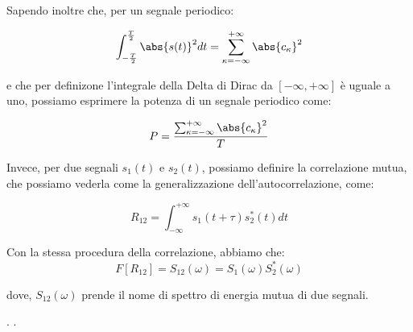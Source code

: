 Sapendo inoltre che, per un segnale periodico: 

{
    \Large 
    \begin{equation}
        \int_{-\frac{T}{2}}^{\frac{T}{2}} 
            \abs{s(t)}^{2} 
            dt 
            =
            \sum_{\kappa = - \infty}^{+ \infty} 
            \abs{c_\kappa}^{2}
    \end{equation}
} 

e che per definizone l'integrale della Delta di Dirac da $[- \infty,  + \infty]$ è uguale a uno, 
possiamo esprimere la potenza di un segnale periodico come: 

{
    \Large 
    \begin{equation}
        P = \frac{\sum_{\kappa = - \infty}^{+ \infty} 
        \abs{c_\kappa}^{2}}{T}
    \end{equation}
}

Invece, per due segnali $s_1 (t)$ e $s_2 (t)$, possiamo definire la correlazione mutua, 
che possiamo vederla come la generalizzazione dell'autocorrelazione, come: 

{
    \Large 
    \begin{equation}
        R_{12} 
        = 
        \int_{- \infty}^{+ \infty}
        s_1 (t + \tau) 
        s_2 ^{*} (t) 
        dt 
    \end{equation}
}

Con la stessa procedura della correlazione, abbiamo che: 
{
    \Large 
    \begin{equation}
        F [R_{12}] 
        = 
        S_{12} (\omega) 
        = 
        S_1 (\omega) 
        S_2 ^{*} (\omega)
    \end{equation}
} 

dove, $S_{12} (\omega)$ prende il nome di spettro di energia mutua di due segnali. \newline 

\newpage 
.
\newpage 
.
\newpage 
